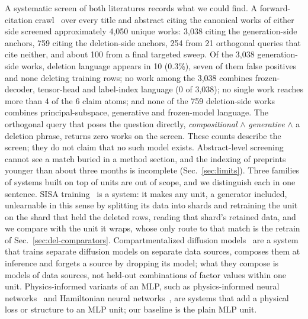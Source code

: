 \documentclass{article} %
\begin{document}
A systematic screen of both literatures records what we could find. A
forward-citation crawl~\citep{priem_openalex_2022} over every title and abstract citing the canonical works of either side
screened approximately 4,050 unique works: 3,038 citing the generation-side anchors, 759 citing
the deletion-side anchors, 254 from 21 orthogonal queries that cite neither, and about 100 from
a final targeted sweep. %
Of the 3,038 generation-side works, deletion language appears in 10 (0.3\%), seven of them
false positives and none deleting training rows; no work among the 3,038 combines frozen-decoder, tensor-head
and label-index language (0 of 3,038); no single work reaches more than 4 of the 6 claim atoms;
and none of the 759 deletion-side works combines principal-subspace, generative and
frozen-model language. %
The orthogonal query that poses the question directly, \emph{compositional} $\wedge$
\emph{generative} $\wedge$ a deletion phrase, returns zero works on the screen.
These counts describe the screen; they do not claim that no such model exists. Abstract-level
screening cannot see a match buried in a method section, and the indexing of preprints younger
than about three months is incomplete (Sec.~\ref{sec:limits}).
Three families of systems built on top of units are out of scope, and we distinguish each in one sentence.
SISA training~\citep{bourtoule_machine_2021} is a system: it makes any unit, a generator included,
unlearnable in this sense by splitting its data into shards and retraining the unit on the shard that
held the deleted rows, reading that shard's retained data, and we compare with the unit it wraps,
whose only route to that match is the retrain of Sec.~\ref{sec:del-comparators}.
Compartmentalized diffusion models~\citep{golatkar_training_2024} are a system that
trains separate diffusion models on separate data sources, composes them at inference and forgets a
source by dropping its model; what they compose is models of data sources, not held-out
combinations of factor values within one unit.
Physics-informed variants of an MLP, such as physics-informed neural
networks~\citep{raissi_physics-informed_2019} and Hamiltonian neural networks~\citep{greydanus_hamiltonian_2019}, are
systems that add a physical loss or structure to an MLP unit; our baseline is the plain MLP unit.
\end{document}
